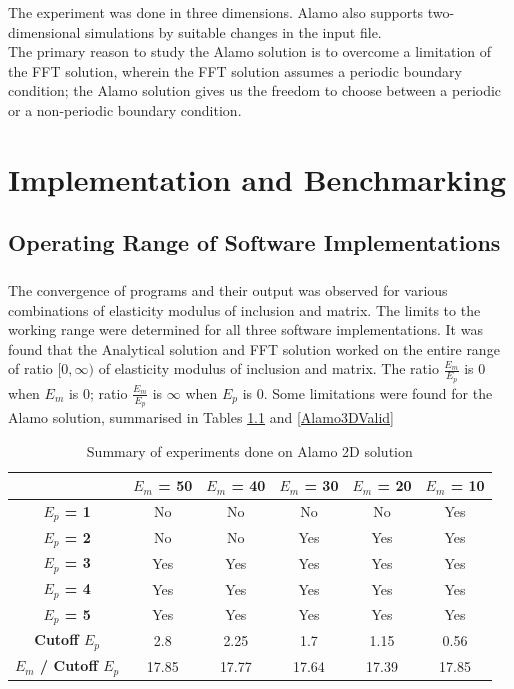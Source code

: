 \documentclass[12pt, a4paper]{report}
\begin{document}
The experiment was done in three dimensions. Alamo also supports two-dimensional simulations by suitable changes in the input file.\\


The primary reason to study the Alamo solution is to overcome a limitation of the FFT solution, wherein the FFT solution assumes a periodic boundary condition; the Alamo solution gives us the freedom to choose between a periodic or a non-periodic boundary condition.

\chapter{Implementation and Benchmarking}
\section{Operating Range of Software Implementations}
\paragraph{}
The convergence of programs and their output was observed for various combinations of elasticity modulus of inclusion and matrix. The limits to the working range were determined for all three software implementations. It was found that the Analytical solution and FFT solution worked on the entire range of ratio $[0, \infty)$ of elasticity modulus of inclusion and matrix. The ratio $\frac{E_m}{E_p}$ is 0 when $E_m$ is 0; ratio $\frac{E_m}{E_p}$ is $\infty$ when $E_p$ is 0. Some limitations were found for the Alamo solution, summarised in Tables \ref{Alamo2DValid} and \ref{Alamo3DValid}

\begin{table}[H]
    \centering
    \begin{tabular}{|c|c|c|c|c|c|}
        \hline
        & \textbf{$E_m$ = 50} &\textbf{$E_m$ = 40}&\textbf{$E_m$ = 30}&\textbf{$E_m$ = 20}&\textbf{$E_m$ = 10}\\
        \hline
        \textbf{$E_p$ = 1} & No & No & No & No & Yes\\
        \hline
        \textbf{$E_p$ = 2} & No & No & Yes & Yes & Yes\\
        \hline
        \textbf{$E_p$ = 3} & Yes & Yes & Yes & Yes & Yes\\
        \hline
        \textbf{$E_p$ = 4} & Yes & Yes & Yes & Yes & Yes\\
        \hline
        \textbf{$E_p$ = 5} & Yes & Yes & Yes & Yes & Yes\\
        \hline
        \textbf{Cutoff $E_p$} & 2.8 & 2.25 & 1.7 & 1.15 & 0.56\\
        \hline
        \textbf{$E_m$ / Cutoff $E_p$} & 17.85 & 17.77 & 17.64 & 17.39 & 17.85\\
        \hline
    \end{tabular}
    \caption{Summary of experiments done on Alamo 2D solution}
    \label{Alamo2DValid}
\end{table}
\end{document}
